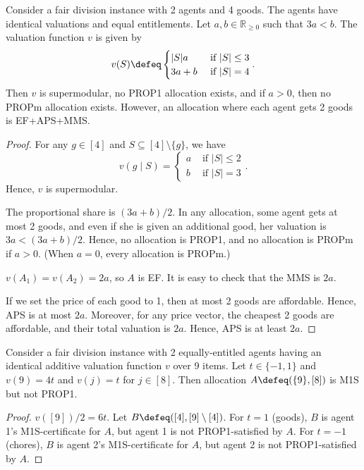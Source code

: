 \begin{lemma}
\label{cex:ef-not-prop-submod}
Consider a fair division instance with 2 agents and 4 goods.
The agents have identical valuations and equal entitlements.
Let $a, b \in \mathbb{R}_{\ge 0}$ such that $3a < b$.
The valuation function $v$ is given by
\[ v(S) \defeq \begin{cases}
|S|a & \textrm{ if } |S| \le 3
\\ 3a + b & \textrm{ if } |S| = 4
\end{cases}. \]
Then $v$ is supermodular, no PROP1 allocation exists,
and if $a > 0$, then no PROPm allocation exists.
However, an allocation where each agent gets 2 goods is EF+APS+MMS.
\end{lemma}
\begin{proof}
For any $g \in [4]$ and $S \subseteq [4] \setminus \{g\}$, we have
\[ v(g \mid S) = \begin{cases}
a & \textrm{ if } |S| \le 2
\\ b & \textrm{ if } |S| = 3
\end{cases}. \]
Hence, $v$ is supermodular.

The proportional share is $(3a + b)/2$.
In any allocation, some agent gets at most 2 goods,
and even if she is given an additional good, her valuation is $3a < (3a+b)/2$.
Hence, no allocation is PROP1, and no allocation is PROPm if $a > 0$.
(When $a = 0$, every allocation is PROPm.)

$v(A_1) = v(A_2) = 2a$, so $A$ is EF.
It is easy to check that the MMS is $2a$.

If we set the price of each good to 1, then at most 2 goods are affordable.
Hence, APS is at most $2a$.
Moreover, for any price vector, the cheapest 2 goods are affordable, and their total valuation is $2a$.
Hence, APS is at least $2a$.
\end{proof}

\begin{lemma}
\label{cex:m1s-not-prop1}
Consider a fair division instance with 2 equally-entitled agents
having an identical additive valuation function $v$ over 9 items.
Let $t \in \{-1, 1\}$ and $v(9) = 4t$ and $v(j) = t$ for $j \in [8]$.
Then allocation $A \defeq (\{9\}, [8])$ is M1S but not PROP1.
\end{lemma}
\begin{proof}
$v([9])/2 = 6t$. Let $B \defeq ([4], [9] \setminus [4])$.
%
For $t = 1$ (goods), $B$ is agent 1's M1S-certificate for $A$,
but agent 1 is not PROP1-satisfied by $A$.
%
For $t = -1$ (chores), $B$ is agent 2's M1S-certificate for $A$,
but agent 2 is not PROP1-satisfied by $A$.
\end{proof}

